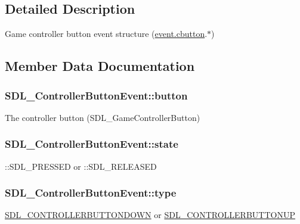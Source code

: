 \subsection{Detailed Description}
Game controller button event structure (\hyperlink{unionSDL__Event_aee2b5671c8dcdb447023715cc21593cb}{event.\+cbutton}.$\ast$) 

\subsection{Member Data Documentation}
\hypertarget{structSDL__ControllerButtonEvent_a039da6cd31c3c62e62a3ae17cc64d0db}{}
\subsubsection[{button}]{ S\+D\+L\+\_\+\+Controller\+Button\+Event\+::button}\label{structSDL__ControllerButtonEvent_a039da6cd31c3c62e62a3ae17cc64d0db}
The controller button (S\+D\+L\+\_\+\+Game\+Controller\+Button) \hypertarget{structSDL__ControllerButtonEvent_a00c46683f86674c2a4f74404ee3e857c}{}
\subsubsection[{state}]{ S\+D\+L\+\_\+\+Controller\+Button\+Event\+::state}\label{structSDL__ControllerButtonEvent_a00c46683f86674c2a4f74404ee3e857c}
\+::\+S\+D\+L\+\_\+\+P\+R\+E\+S\+S\+E\+D or \+::\+S\+D\+L\+\_\+\+R\+E\+L\+E\+A\+S\+E\+D \hypertarget{structSDL__ControllerButtonEvent_a09869d792031e47a88673d85915c209f}{}
\subsubsection[{type}]{ S\+D\+L\+\_\+\+Controller\+Button\+Event\+::type}\label{structSDL__ControllerButtonEvent_a09869d792031e47a88673d85915c209f}
\hyperlink{SDL__events_8h_a3b589e89be6b35c02e0dd34a55f3fccaaafe044d5f92ac9608ded473218569474}{S\+D\+L\+\_\+\+C\+O\+N\+T\+R\+O\+L\+L\+E\+R\+B\+U\+T\+T\+O\+N\+D\+O\+W\+N} or \hyperlink{SDL__events_8h_a3b589e89be6b35c02e0dd34a55f3fccaa8cb5a10b1ae0e185ef69a321d3d2d1be}{S\+D\+L\+\_\+\+C\+O\+N\+T\+R\+O\+L\+L\+E\+R\+B\+U\+T\+T\+O\+N\+U\+P} \hypertarget{structSDL__ControllerButtonEvent_a98777e88b5d5cae83eef16ffd4bcacc1}{}

